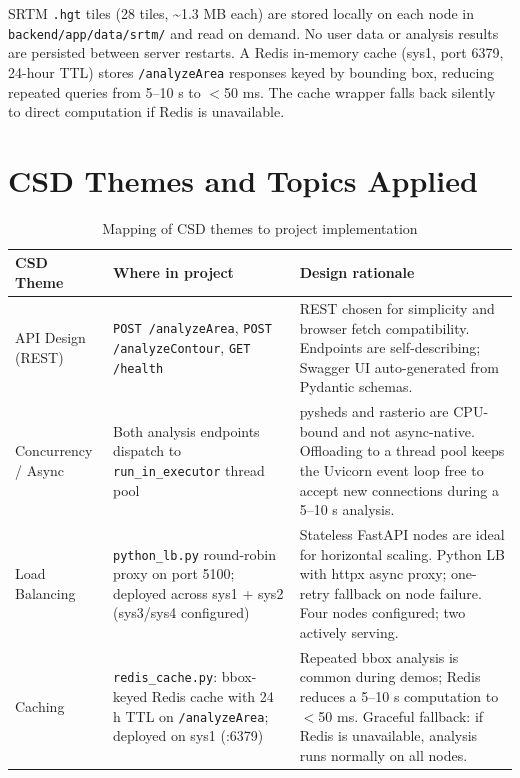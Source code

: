 \documentclass[manuscript,screen,review]{acmart}
\begin{document}
SRTM \texttt{.hgt} tiles (28 tiles, \textasciitilde 1.3 MB each)
are stored locally on each node in \texttt{backend/app/data/srtm/}
and read on demand. No user data or analysis results are persisted
between server restarts. A Redis in-memory cache (sys1, port 6379,
24-hour TTL) stores \texttt{/analyzeArea} responses keyed by
bounding box, reducing repeated queries from 5--10 s to $<$50 ms.
The cache wrapper falls back silently to direct computation if Redis
is unavailable.

\section{CSD Themes and Topics Applied}
\label{sec:csd-themes}

\begin{table}[t]
  \caption{Mapping of CSD themes to project implementation}
  \label{tab:csd-themes}
  \begin{tabular}{p{2.8cm}p{5.0cm}p{6.5cm}}
    \toprule
    CSD Theme & Where in project & Design rationale \\
    \midrule
    API Design (REST) &
      \texttt{POST /analyzeArea}, \texttt{POST /analyzeContour},
      \texttt{GET /health} &
      REST chosen for simplicity and browser fetch compatibility.
      Endpoints are self-describing; Swagger UI auto-generated
      from Pydantic schemas. \\
    Concurrency / Async &
      Both analysis endpoints dispatch to
      \texttt{run\_in\_executor} thread pool &
      pysheds and rasterio are CPU-bound and not async-native.
      Offloading to a thread pool keeps the Uvicorn event loop
      free to accept new connections during a 5--10 s analysis. \\
    Load Balancing &
      \texttt{python\_lb.py} round-robin proxy on port 5100;
      deployed across sys1 + sys2 (sys3/sys4 configured) &
      Stateless FastAPI nodes are ideal for horizontal scaling.
      Python LB with httpx async proxy; one-retry fallback on
      node failure. Four nodes configured; two actively serving. \\
    Caching &
      \texttt{redis\_cache.py}: bbox-keyed Redis cache with 24 h
      TTL on \texttt{/analyzeArea}; deployed on sys1 (:6379) &
      Repeated bbox analysis is common during demos; Redis reduces
      a 5--10 s computation to $<$50 ms. Graceful fallback: if
      Redis is unavailable, analysis runs normally on all nodes. \\

\end{tabular}
\end{table}
\end{document}
